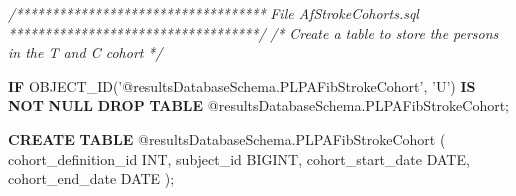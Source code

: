 \documentclass[]{book}
\newenvironment{Shaded}{\begin{snugshade}}{\end{snugshade}}
\newcommand{\KeywordTok}[1]{\textcolor[rgb]{0.13,0.29,0.53}{\textbf{#1}}}
\newcommand{\DataTypeTok}[1]{\textcolor[rgb]{0.13,0.29,0.53}{#1}}
\newcommand{\StringTok}[1]{\textcolor[rgb]{0.31,0.60,0.02}{#1}}
\newcommand{\CommentTok}[1]{\textcolor[rgb]{0.56,0.35,0.01}{\textit{#1}}}
\newcommand{\NormalTok}[1]{#1}
\begin{document}
\begin{Shaded}
\begin{Highlighting}[]
\CommentTok{/***********************************}
\CommentTok{File AfStrokeCohorts.sql}
\CommentTok{***********************************/}
\CommentTok{/*}
\CommentTok{  Create a table to store the persons in the T and C cohort}
\CommentTok{*/}

\KeywordTok{IF}\NormalTok{ OBJECT_ID(}\StringTok{'@resultsDatabaseSchema.PLPAFibStrokeCohort'}\NormalTok{, }\StringTok{'U'}\NormalTok{) }\KeywordTok{IS} \KeywordTok{NOT} \KeywordTok{NULL}
  \KeywordTok{DROP} \KeywordTok{TABLE}\NormalTok{ @resultsDatabaseSchema.PLPAFibStrokeCohort;}

\KeywordTok{CREATE} \KeywordTok{TABLE}\NormalTok{ @resultsDatabaseSchema.PLPAFibStrokeCohort}
\NormalTok{(}
\NormalTok{  cohort_definition_id }\DataTypeTok{INT}\NormalTok{,}
\NormalTok{  subject_id BIGINT,}
\NormalTok{  cohort_start_date }\DataTypeTok{DATE}\NormalTok{,}
\NormalTok{  cohort_end_date }\DataTypeTok{DATE}
\NormalTok{);}



\end{Highlighting}
\end{Shaded}
\end{document}
